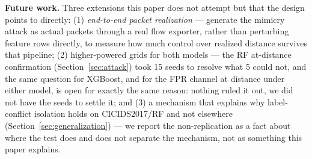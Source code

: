 \textbf{Future work.} Three extensions this paper does not attempt but that the design points to
directly: (1) \emph{end-to-end packet realization} — generate the mimicry attack as actual
packets through a real flow exporter, rather than perturbing feature rows directly, to measure
how much control over realized distance survives that pipeline; (2) higher-powered grids for
both models — the RF at-distance confirmation (Section~\ref{sec:attack}) took 15 seeds to resolve
what 5 could not, and the same question for XGBoost, and for the FPR channel at distance under
either model, is open for exactly the same reason: nothing ruled it out, we did not have the
seeds to settle it; and (3) a mechanism that explains why label-conflict isolation holds on
CICIDS2017/RF and not elsewhere (Section~\ref{sec:generalization}) — we report the non-replication
as a fact about where the test does and does not separate the mechanism, not as something this
paper explains.
